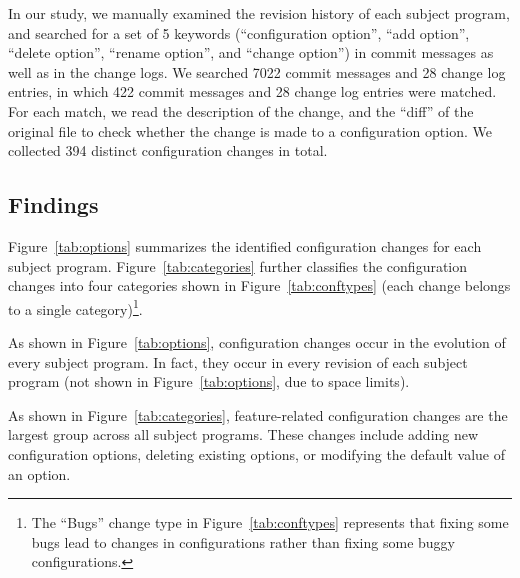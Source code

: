 In our study, %
we manually examined the revision history of each subject program,
and searched for a set of 5 keywords (``configuration option'',
``add option'', ``delete option'', ``rename option'', and ``change option'')
in commit messages as well as in the change logs.
We searched 7022 commit messages and 28 change log entries, in
which 422 commit messages and 28 change log entries were matched.
For each match, we read the description of the change,
and the ``diff'' of the original file to check whether
the change is made to a configuration option. We collected
394 distinct configuration changes in total.




\subsection{Findings}

Figure~\ref{tab:options} summarizes the identified
configuration changes for each subject program.
Figure~\ref{tab:categories} further classifies the
configuration changes into four categories shown
in Figure~\ref{tab:conftypes}
(each change belongs to a single category)\footnote{
The ``Bugs'' change type in Figure~\ref{tab:conftypes}
represents that fixing some bugs lead to changes in
configurations rather than fixing some buggy configurations.
}. 


As shown in Figure~\ref{tab:options}, configuration changes occur
in the evolution of every subject program. In fact, they occur in
every revision of each subject program (not shown in Figure~\ref{tab:options},
due to space limits).  

As shown in Figure~\ref{tab:categories},
feature-related configuration changes are the largest group across
all subject programs. These changes include
adding new configuration options, deleting existing options, or modifying the default
value of an option. 

